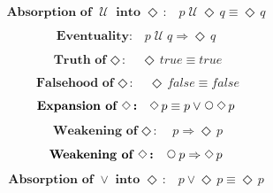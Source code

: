 \documentclass[12pt, fleqn, leqno]{article}
\newcommand{\impl}{\ensuremath{\Rightarrow}}        %
\newcommand{\Until}{\;\mathcal{U}\;}
\newcommand{\Next}{\;\,\text{\raisebox{3.5pt}{\circle{6}}}}
\newcommand{\Event}{\Diamond\,}
\newcommand{\spacer}{\vspace{-30pt}}
\begin{document}
\spacer

\begin{equation}\label{E:absUntilIntoEvent}
\textbf{Absorption of $\Until$ into $\Event$:}\quad p \Until \Event q \equiv \Event q
\end{equation}

\spacer

\begin{equation}\label{E:eventuality}
\textbf{Eventuality:}\quad p \Until q \impl \Event q
\end{equation}

\spacer

\begin{equation}\label{E:eventTrue}
\textbf{Truth of $\Event$:}\quad \Event true \equiv true
\end{equation}

\spacer

\begin{equation}\label{E:eventFalse}
\textbf{Falsehood of $\Event$:}\quad \Event false \equiv false
\end{equation}

\spacer

\begin{equation}\label{E:expansionEvent}
\textbf{Expansion of $\Event$:}\quad \Event p \equiv p \lor \Next\Event p
\end{equation}

\spacer

\begin{equation}\label{E:impEvent}
\textbf{Weakening of $\Event$:}\quad p \impl \Event p
\end{equation}

\spacer

\begin{equation}\label{E:nextEvent}
\textbf{Weakening of $\Event$:}\quad \Next p \impl \Event p
\end{equation}

\spacer

\begin{equation}\label{E:absOrIntoEvent}
\textbf{Absorption of $\lor$ into $\Event$:}\quad p \lor \Event p \equiv \Event p
\end{equation}
\end{document}
